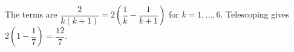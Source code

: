 The terms are $\dfrac{2}{k(k+1)}=2(\dfrac{1}{k}-\dfrac{1}{k+1})$ for $k=1,\ldots,6$. Telescoping gives $2(1-\dfrac{1}{7})=\boxed{\dfrac{12}{7}}$.
